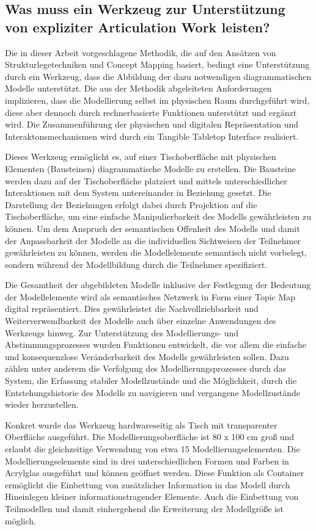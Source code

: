 \subsection{Was muss ein Werkzeug zur Unterstützung von expliziter Articulation Work leisten?}

Die in dieser Arbeit vorgeschlagene Methodik, die auf den Ansätzen von Strukturlegetechniken und Concept Mapping basiert, bedingt eine Unterstützung durch ein Werkzeug, dass die Abbildung der dazu notwendigen diagrammatischen Modelle unterstützt. Die aus der Methodik abgeleiteten Anforderungen implizieren, dass die Modellierung selbst im physischen Raum durchgeführt wird, diese aber dennoch durch rechnerbasierte Funktionen unterstützt und ergänzt wird. Die Zusammenführung der physischen und digitalen Repräsentation und Interaktonsmechanismen wird durch ein Tangible Tabletop Interface realisiert.

Dieses Werkzeug ermöglicht es, auf einer Tischoberfläche mit physischen Elementen (Bausteinen) diagrammatische Modelle zu erstellen. Die Bausteine werden dazu auf der Tischoberfläche platziert und mittels unterschiedlicher Interaktionen mit dem System untereinander in Beziehung gesetzt. Die Darstellung der Beziehungen erfolgt dabei durch Projektion auf die Tischoberfläche, um eine einfache Manipulierbarkeit des Modells gewährleisten zu können. Um dem Anspruch der semantischen Offenheit des Modells und damit der Anpassbarkeit der Modelle an die individuellen Sichtweisen der Teilnehmer gewährleisten zu können, werden die Modellelemente semantisch nicht vorbelegt, sondern während der Modellbildung durch die Teilnehmer spezifiziert. 

Die Gesamtheit der abgebildeten Modelle inklusive der Festlegung der Bedeutung der Modellelemente wird als semantisches Netzwerk in Form einer Topic Map digital repräsentiert. Dies gewährleistet die Nachvollziehbarkeit und Weiterverwendbarkeit der Modelle auch über einzelne Anwendungen des Werkzeugs hinweg. Zur Unterstützung des Modellierungs- und Abstimmungsprozesses wurden Funktionen entwickelt, die vor allem die einfache und konsequenzlose Veränderbarkeit des Modells gewährleisten sollen. Dazu zählen unter anderem die Verfolgung des Modellierungsprozesses durch das System, die Erfassung stabiler Modellzustände und die Möglichkeit, durch die Entstehungshistorie des Modells zu navigieren und vergangene Modellzustände wieder herzustellen.  

Konkret wurde das Werkzeug hardwareseitig als Tisch mit transparenter Oberfläche ausgeführt. Die Modellierungsoberfläche ist 80 x 100 cm groß und erlaubt die gleichzeitige Verwendung von etwa 15 Modellierungselementen. Die Modellierungselemente sind in drei unterschiedlichen Formen und Farben in Acrylglas ausgeführt und können geöffnet werden. Diese Funktion als Container ermöglicht die Einbettung von zusätzlicher Information in das Modell durch Hineinlegen kleiner informationstragender Elemente. Auch die Einbettung von Teilmodellen und damit einhergehend die Erweiterung der Modellgröße ist möglich. 

